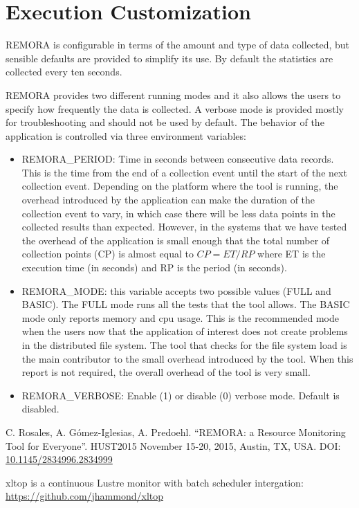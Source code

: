 \documentclass[10pt,a4paper]{report}
\begin{document}
\section{Execution Customization}

REMORA is configurable in terms of the amount and type of data collected, but sensible defaults are provided to simplify its use. By default the statistics are collected every ten seconds.

REMORA provides two different running modes and it also allows the users to specify how frequently the data is collected. A verbose mode is provided mostly for troubleshooting and should not be used by default. The behavior of the application is controlled via three environment variables:

\begin{itemize}
	\item REMORA\_PERIOD: Time in seconds between consecutive data records. This is the time from the end of a collection event until the start of the next collection event. Depending on the platform where the tool is running, the overhead introduced by the application can make the duration of the collection event to vary, in which case there will be less data points in the collected results than expected. However, in the systems that we have tested the overhead of the application is small enough that the total number of collection points (CP) is almost equal to $CP = ET/RP$ where ET is the execution time (in seconds) and RP is the period (in seconds).

	\item REMORA\_MODE: this variable accepts two possible values (FULL and BASIC). The FULL mode runs all the tests that the tool allows. The BASIC mode only reports memory and cpu usage. This is the recommended mode when the users now that the application of interest does not create problems in the distributed file system. The tool that checks for the file system load \cite{xltop} is the main contributor to the small overhead introduced by the tool. When this report is not required, the overall overhead of the tool is very small.
	
	\item REMORA\_VERBOSE: Enable (1) or disable (0) verbose mode. Default is disabled.
\end{itemize}

\FloatBarrier
{}
\begin{thebibliography}{00}

 C. Rosales, A. G\'{o}mez-Iglesias, A. Predoehl. ``REMORA: a Resource Monitoring Tool for Everyone''. HUST2015 November 15-20, 2015, Austin, TX, USA. DOI: \href{http://dx.doi.org/10.1145/2834996.2834999}{10.1145/2834996.2834999}

xltop is a continuous Lustre monitor with batch scheduler intergation: \href{https://github.com/jhammond/xltop}{https://github.com/jhammond/xltop}


\end{thebibliography}
\end{document}
